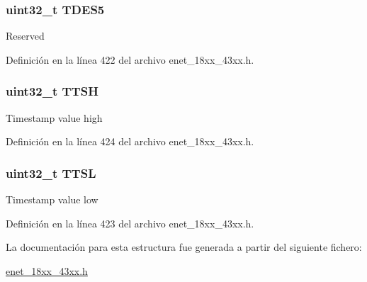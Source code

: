 \subsubsection[{\texorpdfstring{T\+D\+E\+S5}{TDES5}}]{ uint32\+\_\+t T\+D\+E\+S5}\hypertarget{struct_e_n_e_t___e_n_h_t_x_d_e_s_c___t_aaf71d062f1683e5d39a45ef7f2c6426a}{}\label{struct_e_n_e_t___e_n_h_t_x_d_e_s_c___t_aaf71d062f1683e5d39a45ef7f2c6426a}
Reserved 

Definición en la línea 422 del archivo enet\+\_\+18xx\+\_\+43xx.\+h.

\subsubsection[{\texorpdfstring{T\+T\+SH}{TTSH}}]{ uint32\+\_\+t T\+T\+SH}\hypertarget{struct_e_n_e_t___e_n_h_t_x_d_e_s_c___t_aaedbaa65bc9e7793f623a0c51579caef}{}\label{struct_e_n_e_t___e_n_h_t_x_d_e_s_c___t_aaedbaa65bc9e7793f623a0c51579caef}
Timestamp value high 

Definición en la línea 424 del archivo enet\+\_\+18xx\+\_\+43xx.\+h.

\subsubsection[{\texorpdfstring{T\+T\+SL}{TTSL}}]{ uint32\+\_\+t T\+T\+SL}\hypertarget{struct_e_n_e_t___e_n_h_t_x_d_e_s_c___t_a4d320aa0e2dab7d9726c99a2c96a0cd5}{}\label{struct_e_n_e_t___e_n_h_t_x_d_e_s_c___t_a4d320aa0e2dab7d9726c99a2c96a0cd5}
Timestamp value low 

Definición en la línea 423 del archivo enet\+\_\+18xx\+\_\+43xx.\+h.



La documentación para esta estructura fue generada a partir del siguiente fichero\+:\begin{DoxyCompactItemize}
\item 
\hyperlink{enet__18xx__43xx_8h}{enet\+\_\+18xx\+\_\+43xx.\+h}\end{DoxyCompactItemize}
